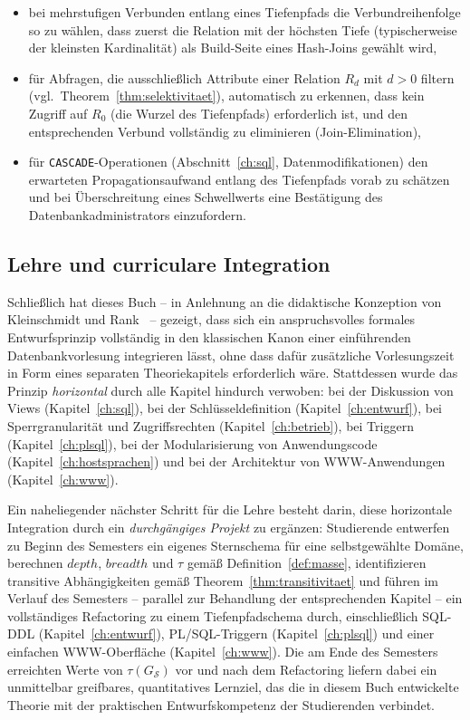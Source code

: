 ﻿\documentclass[a4paper,12pt]{report}
\theoremstyle{definition}
\theoremstyle{remark}
\newcommand{\depth}{\mathit{depth}}
\newcommand{\breadth}{\mathit{breadth}}
\begin{document}
\begin{itemize}
  \item bei mehrstufigen Verbunden entlang eines Tiefenpfads die
    Verbundreihenfolge so zu wählen, dass zuerst die Relation mit der
    höchsten Tiefe (typischerweise der kleinsten Kardinalität) als
    Build-Seite eines Hash-Joins gewählt wird,
  \item für Abfragen, die ausschließlich Attribute einer Relation
    $R_d$ mit $d > 0$ filtern (vgl.\ Theorem~\ref{thm:selektivitaet}),
    automatisch zu erkennen, dass kein Zugriff auf $R_0$ (die Wurzel
    des Tiefenpfads) erforderlich ist, und den entsprechenden
    Verbund vollständig zu eliminieren (Join-Elimination),
  \item für \texttt{CASCADE}-Operationen (Abschnitt~\ref{ch:sql},
    Datenmodifikationen) den erwarteten Propagationsaufwand entlang
    des Tiefenpfads vorab zu schätzen und bei Überschreitung eines
    Schwellwerts eine Bestätigung des Datenbankadministrators
    einzufordern.
\end{itemize}

\subsection{Lehre und curriculare Integration}
\label{sec:ausblick-lehre}

Schließlich hat dieses Buch -- in Anlehnung an die didaktische
Konzeption von Kleinschmidt und Rank~\cite{Kleinschmidt2002} -- gezeigt,
dass sich ein anspruchsvolles formales Entwurfsprinzip vollständig in
den klassischen Kanon einer einführenden Datenbankvorlesung integrieren
lässt, ohne dass dafür zusätzliche Vorlesungszeit in Form eines
separaten Theoriekapitels erforderlich wäre. Stattdessen wurde das
Prinzip \emph{horizontal} durch alle Kapitel hindurch verwoben: bei der
Diskussion von Views (Kapitel~\ref{ch:sql}), bei der
Schlüsseldefinition (Kapitel~\ref{ch:entwurf}), bei
Sperrgranularität und Zugriffsrechten (Kapitel~\ref{ch:betrieb}), bei
Triggern (Kapitel~\ref{ch:plsql}), bei der Modularisierung von
Anwendungscode (Kapitel~\ref{ch:hostsprachen}) und bei der
Architektur von WWW-Anwendungen (Kapitel~\ref{ch:www}).

Ein naheliegender nächster Schritt für die Lehre besteht darin, diese
horizontale Integration durch ein \emph{durchgängiges Projekt} zu
ergänzen: Studierende entwerfen zu Beginn des Semesters ein eigenes
Sternschema für eine selbstgewählte Domäne, berechnen
$\depth$, $\breadth$ und $\tau$ gemäß Definition~\ref{def:masse},
identifizieren transitive Abhängigkeiten gemäß
Theorem~\ref{thm:transitivitaet} und führen im Verlauf des Semesters --
parallel zur Behandlung der entsprechenden Kapitel -- ein vollständiges
Refactoring zu einem Tiefenpfadschema durch, einschließlich
SQL-DDL (Kapitel~\ref{ch:entwurf}), PL/SQL-Triggern
(Kapitel~\ref{ch:plsql}) und einer einfachen WWW-Oberfläche
(Kapitel~\ref{ch:www}). Die am Ende des Semesters erreichten Werte von
$\tau(G_{\mathcal{S}})$ vor und nach dem Refactoring liefern dabei ein
unmittelbar greifbares, quantitatives Lernziel, das die in diesem Buch
entwickelte Theorie mit der praktischen Entwurfskompetenz der
Studierenden verbindet.
\end{document}
